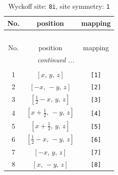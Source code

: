 \documentclass[fleqn,8pt]{jsarticle}
\begin{document}
\renewcommand{\arraystretch}{1.2}
\begin{longtable}{ccc}
\caption{Wyckoff site: {\tt 8i}, site symmetry: {\tt 1}}
 \\
 \hline \hline
No. & position & mapping \\ \hline \endfirsthead

\multicolumn{2}{l}{\tablename\ \thetable{}} \\
 \hline \hline
No. & position & mapping \\ \hline \endhead

 \hline \hline
\multicolumn{2}{r}{\footnotesize\it continued ...} \\ \endfoot

 \hline \hline
\multicolumn{2}{r}{} \\ \endlastfoot

1 & $\left[ x,\, y,\, z \right]$ & {\tt [1]} \\ \hline
2 & $\left[ - x,\, - y,\, z \right]$ & {\tt [2]} \\ \hline
3 & $\left[ \frac{1}{2} - x,\, y,\, z \right]$ & {\tt [3]} \\ \hline
4 & $\left[ x + \frac{1}{2},\, - y,\, z \right]$ & {\tt [4]} \\ \hline
5 & $\left[ x + \frac{1}{2},\, y,\, z \right]$ & {\tt [5]} \\ \hline
6 & $\left[ \frac{1}{2} - x,\, - y,\, z \right]$ & {\tt [6]} \\ \hline
7 & $\left[ - x,\, y,\, z \right]$ & {\tt [7]} \\ \hline
8 & $\left[ x,\, - y,\, z \right]$ & {\tt [8]} \\
\end{longtable}
\end{document}

